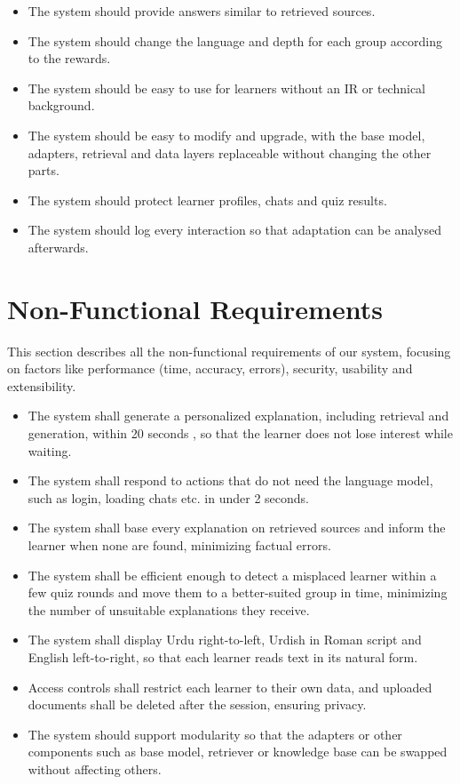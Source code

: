 \documentclass{FastFyp}
\begin{document}
\begin{itemize}
    \item The system should provide answers similar to retrieved sources.
    \item The system should change the language and depth for each group according to the rewards.
    \item The system should be easy to use for learners without an IR or technical background.
    \item The system should be easy to modify and upgrade, with the base model, adapters, retrieval and data layers replaceable without changing the other parts.
    \item The system should protect learner profiles, chats and quiz results.
    \item The system should log every interaction so that adaptation can be analysed afterwards.
\end{itemize}

\section{Non-Functional Requirements}

This section describes all the non-functional requirements of our system, focusing on factors like performance (time, accuracy, errors), security, usability and extensibility.
 
\begin{itemize}
    \item The system shall generate a personalized explanation, including retrieval and generation, within 20 seconds , so that the learner does not lose interest while waiting.
    \item The system shall respond to actions that do not need the language model, such as login, loading chats etc. in under 2 seconds.
    \item The system shall base every explanation on retrieved sources and inform the learner when none are found, minimizing factual errors.
    \item The system shall be efficient enough to detect a misplaced learner within a few quiz rounds and move them to a better-suited group in time, minimizing the number of unsuitable explanations they receive.
    \item The system shall display Urdu right-to-left, Urdish in Roman script and English left-to-right, so that each learner reads text in its natural form.
    \item Access controls shall restrict each learner to their own data, and uploaded documents shall be deleted after the session, ensuring privacy.
    \item The system should support modularity so that the adapters or other components such as base model, retriever or knowledge base can be swapped without affecting others.
\end{itemize}
 
\end{document}
